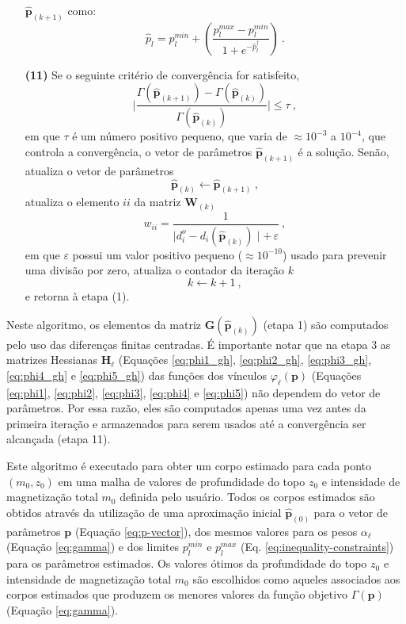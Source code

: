 \begin{itemize}
	$\hat{\mathbf{p}}_{(k+1)}$ como:
	$$
	\hat{p}_{l} = p_{l}^{min} + \left(\frac{p_{l}^{max} - p_{l}^{min}}{ 1 + e^{-\hat{p}^{\dagger}_{l}} }\right) \: .
	$$
	\item[\textbf{(11)}] Se o seguinte critério de convergência for satisfeito,
	$$
	\Bigg|
	\frac{\Gamma(\hat{\mathbf{p}}_{(k+1)}) - \Gamma(\hat{\mathbf{p}}_{(k)})}
	{\Gamma(\hat{\mathbf{p}}_{(k)})} 
	\Bigg| \le \tau \: ,
	$$ 
	em que $\tau$ é um número positivo pequeno, que varia de $\approx 10^{-3}$ a 
	$10^{-4}$, que controla a convergência, o vetor de parâmetros $\hat{\mathbf{p}}_{(k+1)}$ é a solução. 
	Senão, atualiza o vetor de parâmetros 
	$$
	\hat{\mathbf{p}}_{(k)} \leftarrow \hat{\mathbf{p}}_{(k+1)} \: ,
	$$
	atualiza o elemento $ii$ da matriz $\mathbf{W}_{(k)}$
	$$
	w_{ii} = \frac{1}{\mid d_{i}^{o} -d_{i}(\hat{\mathbf{p}}_{(k)}) \mid + 
		\, \varepsilon} \: ,
	$$
	em que $\varepsilon$ possui um valor positivo pequeno ($\approx 10^{-10}$) usado
	para prevenir uma divisão por zero, atualiza o contador da iteração $k$
	$$
	k \leftarrow k + 1 \: ,
	$$
	e retorna à etapa (1).
\end{itemize}

Neste algoritmo, os elementos da matriz $\mathbf{G}(\hat{\mathbf{p}}_{(k)})$ 
(etapa 1) são computados pelo uso das diferenças finitas centradas.
É importante notar que na etapa 3 as matrizes Hessianas $\mathbf{H}_{\ell}$ (Equações \ref{eq:phi1_gh}, \ref{eq:phi2_gh}, \ref{eq:phi3_gh}, \ref{eq:phi4_gh} e \ref{eq:phi5_gh})
das funções dos vínculos $\varphi_{\ell}(\mathbf{p})$ 
(Equações \ref{eq:phi1}, \ref{eq:phi2}, \ref{eq:phi3}, \ref{eq:phi4} e \ref{eq:phi5}) 
não dependem do vetor de parâmetros. Por essa razão, eles são computados apenas uma vez antes da primeira iteração e armazenados para serem usados até a convergência ser alcançada (etapa 11).

Este algoritmo é executado para obter um corpo estimado para cada ponto 
$(m_{0}, z_{0})$ em uma malha de valores de profundidade do topo $z_{0}$ e intensidade de magnetização total $m_{0}$ definida pelo usuário. 
Todos os corpos estimados são obtidos através da utilização de uma aproximação inicial $\hat{\mathbf{p}}_{(0)}$ para o vetor de parâmetros
$\mathbf{p}$ (Equação \ref{eq:p-vector}), dos mesmos valores para os pesos
$\alpha_{\ell}$ (Equação \ref{eq:gamma}) e dos limites $p_{l}^{min}$ e 
$p_{l}^{max}$ (Eq. \ref{eq:inequality-constraints}) para os parâmetros estimados.
Os valores ótimos da profundidade do topo $z_{0}$ e intensidade de magnetização total
$m_{0}$ são escolhidos como aqueles associados aos corpos estimados que produzem os menores valores da função objetivo $\Gamma (\mathbf{p})$ (Equação \ref{eq:gamma}).

